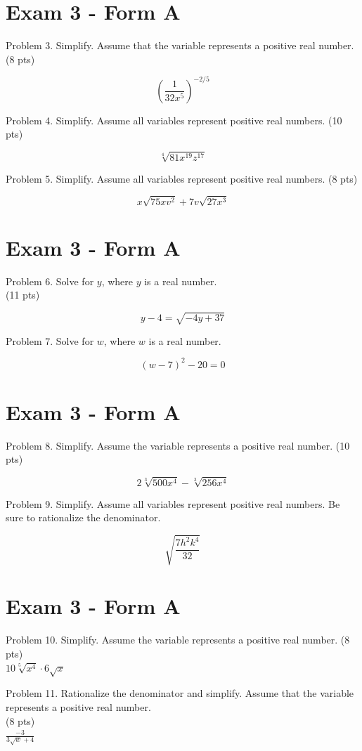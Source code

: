 \documentclass{ximera}
\begin{document}
\section*{Exam 3 - Form A}
Problem 3. Simplify. Assume that the variable represents a positive real number. (8 pts)

$$\left(\frac{1}{32 x^{5}}\right)^{-2 / 5}$$

Problem 4. Simplify. Assume all variables represent positive real numbers. (10 pts)

$$\sqrt[4]{81 x^{19} z^{17}}$$

Problem 5. Simplify. Assume all variables represent positive real numbers. (8 pts)

$$x \sqrt{75 x v^{2}}+7 v \sqrt{27 x^{3}}$$

\section*{Exam 3 - Form A}
Problem 6. Solve for $y$, where $y$ is a real number.\\
(11 pts)

$$y-4=\sqrt{-4 y+37}$$

Problem 7. Solve for $w$, where $w$ is a real number.

$$(w-7)^{2}-20=0$$

\section*{Exam 3 - Form A}
Problem 8. Simplify. Assume the variable represents a positive real number. (10 pts)

$$2 \sqrt[3]{500 x^{4}}-\sqrt[3]{256 x^{4}}$$

Problem 9. Simplify. Assume all variables represent positive real numbers. Be sure to rationalize the denominator.

$$\sqrt{\frac{7 h^{2} k^{4}}{32}}$$

\section*{Exam 3 - Form A}
Problem 10. Simplify. Assume the variable represents a positive real number. (8 pts)\\
$10 \sqrt[5]{x^{4}} \cdot 6 \sqrt{x}$

Problem 11. Rationalize the denominator and simplify. Assume that the variable represents a positive real number.\\
(8 pts)\\
$\frac{-3}{3 \sqrt{w}+4}$
\end{document}
